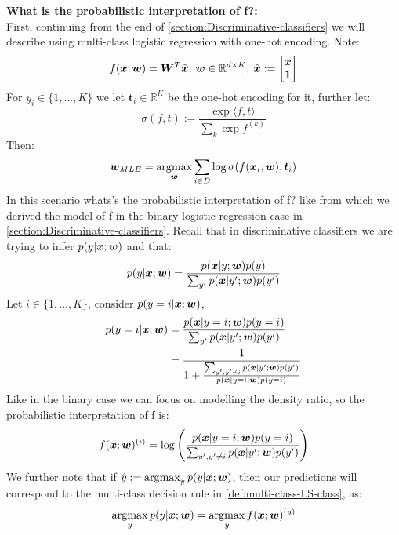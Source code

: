 \begin{appendices}
\begin{question} \label{question:prob-interp-f}
    \textbf{What is the probabilistic interpretation of f?:} \\
    First, continuing from the end of \cref{section:Discriminative-classifiers} we will describe using multi-class logistic regression with one-hot encoding. Note:
    \begin{align}
        f(\bm{x};\bm{w}) = \bm{W}^{T} \tilde{\bm{x}}, \: \bm{w} \in \mathbb{R}^{d \times K}, \: \tilde{\bm{x}} := 
        \begin{bmatrix}
            \bm{x} \\
            \bm{1}
        \end{bmatrix}
    \end{align}
    For $y_{i} \in \{1,...,K\}$ we let $\bm{t}_{i} \in \mathbb{R}^{K}$ be the one-hot encoding for it, further let:
    \begin{equation}
        \sigma(f,t) := \frac{\exp \langle f,t \rangle}{\sum_{k} \exp f^{(k)}}
    \end{equation}
    Then:
    \begin{equation}
        \bm{w}_{MLE} = \operatorname*{arg\!\max}_{\bm{w}} \sum_{i \in D} \log \sigma(f(\bm{x}_{i} ; \bm{w}), \bm{t}_{i})
    \end{equation}
    In this scenario whats's the probabilistic interpretation of f? like from which we derived the model of f in the binary logistic regression case in \cref{section:Discriminative-classifiers}. Recall that in discriminative classifiers we are trying to infer $p(y|\bm{x};\bm{w})$ and that:
    \begin{equation}
        p(y|\bm{x};\bm{w}) = \frac{p(\bm{x}|y;\bm{w})p(y)}{\sum_{y'} p(\bm{x}|y';\bm{w})p(y')}
    \end{equation}
    Let $i \in \{1,...,K\}$, consider $p(y=i|\bm{x};\bm{w})$,
    \begin{align}
        p(y=i |\bm{x};\bm{w}) &{} = \frac{p(\bm{x}|y=i;\bm{w})p(y=i)}{\sum_{y'} p(\bm{x}|y';\bm{w})p(y')} \\
        &= \frac{1}{1+ \frac{\sum_{y',y' \neq i} p(\bm{x}|y';\bm{w})p(y')}{p(\bm{x}|y=i;\bm{w})p(y=i)}}
    \end{align}
    Like in the binary case we can focus on modelling the density ratio, so the probabilistic interpretation of f is:
    \begin{equation}
        f(\bm{x};\bm{w})^{(i)} = \log \left(\frac{p(\bm{x}|y=i;\bm{w})p(y=i)}{\sum_{y',y'\neq i} p(\bm{x}|y';\bm{w}) p(y')} \right)
    \end{equation}
    We further note that if $\hat{y} := \operatorname*{arg\!\max}_{y} p(y|\bm{x};\bm{w})$, then our predictions will correspond to the multi-class decision rule in \cref{def:multi-class-LS-class}, as:
    \begin{equation}
        \operatorname*{arg\!\max}_{y} p(y|\bm{x};\bm{w}) = \operatorname*{arg\!\max}_{y} f(\bm{x};\bm{w})^{(y)}
    \end{equation}
\end{question}

\end{appendices}